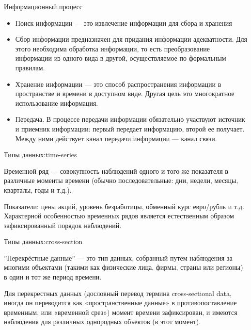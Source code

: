 \documentclass[10pt,pdf,hyperref={unicode}]{beamer}
\begin{document}
\begin{frame}{Информационный процесс}

\begin{small}

\begin{itemize}


  \item Поиск информации — это извлечение  информации  для сбора и хранения 

  \item Сбор информации предназначен для придания информации адекватности.  Для этого необходима обработка информации, то есть
   преобразование информации из одного вида в другой, осуществляемое по формальным правилам. 
 
  \item Хранение информации — это способ распространения информации в пространстве и времени в доступном виде. Другая цель это  многократное
   использование информация. 

  \item  Передача. В процессе передачи информации обязательно участвуют источник и приемник информации: первый передает информацию, второй ее получает. Между ними действует 
  канал передачи информации — канал связи. 
 
\end{itemize}

\end{small}

\end{frame}








\begin{frame}{Типы данных:time-series} 

Временной ряд — совокупность наблюдений одного и того же показателя в различные моменты времени 
(обычно последовательные: дни, недели, месяцы, кварталы, годы и т.д.).

Показатели: цены акций, уровень безработицы, обменный курс евро/рубль и т.д. 
Характерной особенностью временных рядов является естественным образом зафиксированный порядок наблюдений. 


\end{frame}




\begin{frame}{Типы данных:cross-section}

''Перекрёстные данные'' — это тип данных, собранный путем наблюдения за многими объектами 
(такими как физические лица, фирмы, страны или регионы) в один и тот же период времени.

Для перекрестных данных (дословный перевод термина cross-sectional data, 
иногда он переводится как «пространственные данные» в противопоставление временным, или «временной срез») 
момент времени зафиксирован, и имеются наблюдения для различных однородных объектов (в этот момент). 
\end{frame}
\end{document}
